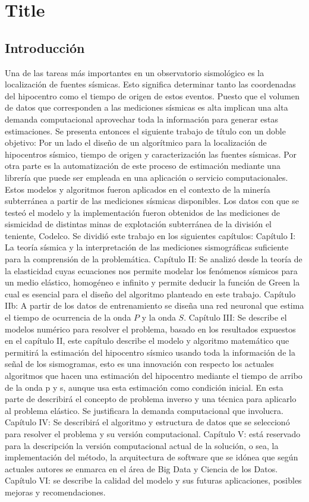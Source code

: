 \documentclass{article}
\begin{document}
\section{Title}

\subsection{Introducción}


Una de las tareas más importantes en un observatorio sismológico es la
localización de fuentes sísmicas. Esto significa determinar tanto las
coordenadas del hipocentro como el tiempo de origen de estos eventos. Puesto
que el volumen de datos que corresponden a las mediciones sísmicas es alta
implican una alta demanda computacional aprovechar toda la información para
generar estas estimaciones.
Se presenta entonces el siguiente trabajo de título con un doble objetivo: Por
un lado el diseño  de un algorítmico para la localización de hipocentros
sísmico, tiempo de origen y caracterización las fuentes sísmicas. Por otra parte es la
automatización de este proceso de estimación mediante una librería que puede ser
empleada en una aplicación o servicio computacionales.
Estos modelos y algoritmos fueron aplicados en el contexto de la minería
subterránea a partir de las mediciones sísmicas disponibles. Los datos con
que se testeó el modelo y la implementación fueron obtenidos de las mediciones
de sismicidad de distintas minas de explotación subterránea de la división el
teniente, Codelco.
Se dividió este trabajo en los siguientes capítulos:
Capítulo I: La teoría sísmica y la interpretación de las mediciones
sismográficas suficiente para la comprensión de la problemática.
Capítulo II: Se analizó desde la teoría de la elasticidad cuyas ecuaciones nos
permite modelar los fenómenos sísmicos para un medio elástico, homogéneo e
infinito y permite deducir la función de Green la cual es esencial para el
diseño del algoritmo planteado en este trabajo.
Capítulo IIb: A partir de los datos de entrenamiento se diseña una red neuronal
que estima el tiempo de ocurrencia de la onda $P$ y la onda $S$.
Capítulo III: Se describe el modelos numérico para resolver el problema, basado
en los resultados expuestos en el capítulo II, este capítulo describe el modelo
y algoritmo matemático que permitirá la estimación del hipocentro sísmico usando
toda la información de la señal de los sismogramas, esto es una innovación con
respecto los actuales algoritmos que hacen una estimación del hipocentro
mediante el tiempo de arribo de la onda p y s, aunque usa esta estimación como
condición inicial. En esta parte de describirá el concepto de problema inverso y
una técnica para aplicarlo al problema elástico. Se justificara la demanda
computacional que involucra.
Capítulo IV: Se describirá el algoritmo y estructura de datos que se seleccionó
para resolver el problema y su versión computacional.
Capítulo V: está reservado para la descripción la versión computacional actual
de la solución, o sea, la implementación del método, la arquitectura de software
que se idónea que  según actuales autores se enmarca en el área de Big Data y
Ciencia de los Datos.
Capítulo VI: se describe la calidad del modelo y sus futuras aplicaciones,
posibles mejoras y recomendaciones.
\end{document}
